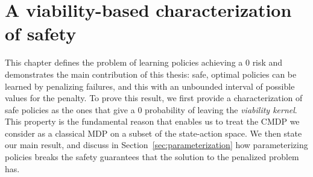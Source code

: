 \chapter{A viability-based characterization of safety} \label{chap:safety from viability}
This chapter defines the problem of learning policies achieving a $0$ risk and demonstrates the main contribution of this thesis: safe, optimal policies can be learned by penalizing failures, and this with an unbounded interval of possible values for the penalty. To prove this result, we first provide a characterization of safe policies as the ones that give a $0$ probability of leaving the\emph{ viability kernel}. This property is the fundamental reason that enables us to treat the CMDP we consider as a classical MDP on a subset of the state-action space. We then state our main result, and discuss in Section~\ref{sec:parameterization} how parameterizing policies breaks the safety guarantees that the solution to the penalized problem has.

